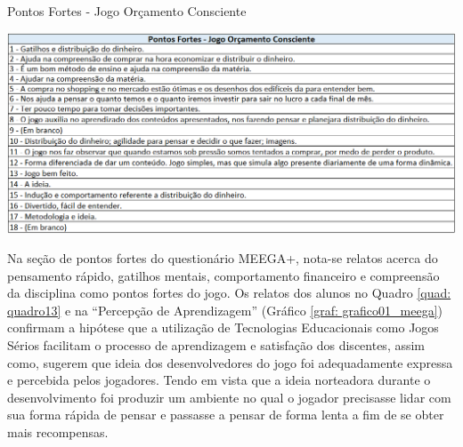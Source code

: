 \graphicspath{{quadros/}} 
\begin{quadro}[!ht]
\centering
\begin{minipage}{1.\textwidth}
\caption{Pontos Fortes - Jogo Orçamento Consciente}
\centering
\includegraphics[width=1.0\textwidth]{quadro-13_consumo-consciente-pontos-fortes}
\label{quad: quadro13}
\end{minipage}
\end{quadro}  

Na seção de pontos fortes do questionário MEEGA+, nota-se relatos acerca do pensamento rápido, gatilhos mentais, comportamento financeiro e compreensão da disciplina como pontos fortes do jogo. Os relatos dos alunos no Quadro \ref{quad: quadro13} e na “Percepção de Aprendizagem” (Gráfico \ref{graf: grafico01_meega}) confirmam a hipótese que a utilização de Tecnologias Educacionais como Jogos Sérios facilitam o processo de aprendizagem e satisfação dos discentes, assim como, sugerem que ideia dos desenvolvedores do jogo foi adequadamente expressa e percebida pelos jogadores. Tendo em vista que a ideia norteadora durante o desenvolvimento foi produzir um ambiente no qual o jogador precisasse lidar com sua forma rápida de pensar e passasse a pensar de forma lenta a fim de se obter mais recompensas.




